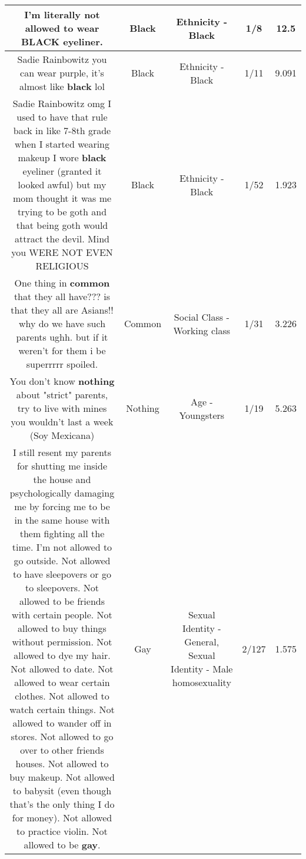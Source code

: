 \documentclass[11pt]{article}
\newlength\mylength
\begin{document}
\begin{center}
\begin{longtable}{|C{.65\mylength}|C{.30\mylength}|C{.12\mylength}|C{.12\mylength}|C{.12\mylength}|}
  \small I'm literally not allowed to wear \textbf{BLACK} eyeliner.\normalsize   & Black & Ethnicity - Black & 1/8 & 12.5 \\  \hline
  \small Sadie Rainbowitz you can wear purple, it's almost like \textbf{black} lol\normalsize   & Black & Ethnicity - Black & 1/11 & 9.091 \\  \hline
  \small Sadie Rainbowitz omg I used to have that rule back in like 7-8th grade when I started wearing makeup I wore \textbf{black} eyeliner (granted it looked awful) but my mom thought it was me trying to be goth and that being goth would attract the devil. Mind you WERE NOT EVEN RELIGIOUS\normalsize   & Black & Ethnicity - Black & 1/52 & 1.923 \\  \hline
  \small One thing in \textbf{common} that they all have??? is that they all are Asians!! why do we have such parents ughh. but if it weren't for them i be superrrrr spoiled.\normalsize   & Common & Social Class - Working class & 1/31 & 3.226 \\  \hline
  \small You don't know \textbf{nothing} about "strict" parents, try to live with mines you wouldn't last a week (Soy Mexicana)\normalsize   & Nothing & Age - Youngsters & 1/19 & 5.263 \\  \hline
  \small I still resent my parents for shutting me inside the house and psychologically damaging me by forcing me to be in the same house with them fighting all the time. I'm not allowed to go outside. Not allowed to have sleepovers or go to sleepovers. Not allowed to be friends with certain people. Not allowed to buy things without permission. Not allowed to dye my hair. Not allowed to date. Not allowed to wear certain clothes. Not allowed to watch certain things. Not allowed to wander off in stores. Not allowed to go over to other friends houses. Not allowed to buy makeup. Not allowed to babysit (even though that's the only thing I do for money). Not allowed to practice violin. Not allowed to be \textbf{g\textbf{ay}}.\normalsize   & Gay & Sexual Identity - General, Sexual Identity - Male homosexuality & 2/127 & 1.575 \\  \hline

\end{longtable}
\end{center}
\end{document}

